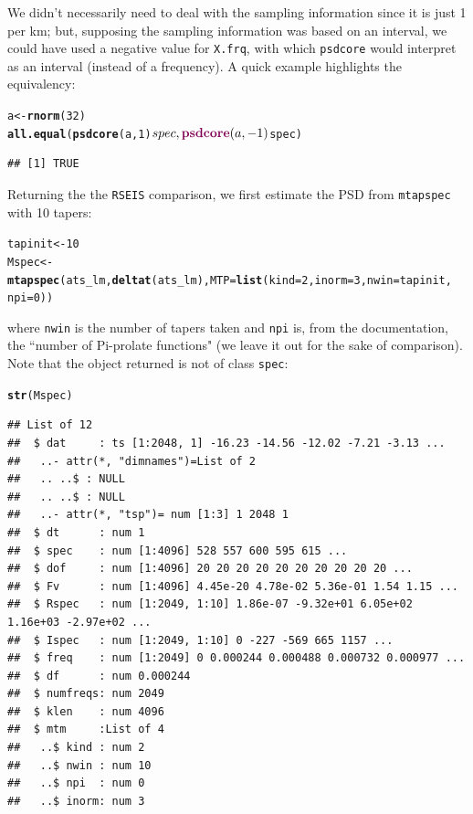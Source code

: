 \documentclass[10pt]{article}\usepackage{graphicx, color}
\makeatletter
\newcommand{\hlfunctioncall}[1]{\textcolor[rgb]{0.501960784313725,0,0.329411764705882}{\textbf{#1}}}%
\newenvironment{kframe}{%
 \def\at@end@of@kframe{}%
 \ifinner\ifhmode%
  \def\at@end@of@kframe{\end{minipage}}%
  \begin{minipage}{\columnwidth}%
 \fi\fi%
 \def\FrameCommand##1{\hskip\@totalleftmargin \hskip-\fboxsep
 \colorbox{shadecolor}{##1}\hskip-\fboxsep
     \hskip-\linewidth \hskip-\@totalleftmargin \hskip\columnwidth}%
 \MakeFramed {\advance\hsize-\width
   \@totalleftmargin\z@ \linewidth\hsize
   \@setminipage}}%
 {\par\unskip\endMakeFramed%
 \at@end@of@kframe}
\newenvironment{knitrout}{}{} %
\newcommand{\Rcmd}[1]{\texttt{#1}}
\makeatother
\begin{document}
We didn't necessarily need to deal with the sampling information since it is just 1 per km;
but, supposing the sampling information was based on an interval, we
could have used
a negative value for \Rcmd{X.frq}, 
with which \Rcmd{psdcore}
would interpret as
an interval (instead of a frequency). 
A quick example highlights the equivalency:
\begin{knitrout}
\color{fgcolor}\begin{kframe}
\begin{alltt}
a <- \hlfunctioncall{rnorm}(32)
\hlfunctioncall{all.equal}(\hlfunctioncall{psdcore}(a, 1)$spec, \hlfunctioncall{psdcore}(a, -1)$spec)
\end{alltt}
\begin{verbatim}
## [1] TRUE
\end{verbatim}
\end{kframe}
\end{knitrout}


Returning the the \Rcmd{RSEIS} comparison, we first 
estimate the PSD from \Rcmd{mtapspec} with 10 tapers:
\begin{knitrout}
\color{fgcolor}\begin{kframe}
\begin{alltt}
tapinit <- 10
Mspec <- \hlfunctioncall{mtapspec}(ats_lm, \hlfunctioncall{deltat}(ats_lm), MTP = \hlfunctioncall{list}(kind = 2, inorm = 3, nwin = tapinit, 
    npi = 0))
\end{alltt}
\end{kframe}
\end{knitrout}

where \Rcmd{nwin} is the number of tapers taken and
\Rcmd{npi} is, from the documentation, the ``number of Pi-prolate functions" (we
leave it out for the sake of comparison). 
Note that the object returned
is not of class \Rcmd{spec}:
\begin{knitrout}
\color{fgcolor}\begin{kframe}
\begin{alltt}
\hlfunctioncall{str}(Mspec)
\end{alltt}
\begin{verbatim}
## List of 12
##  $ dat     : ts [1:2048, 1] -16.23 -14.56 -12.02 -7.21 -3.13 ...
##   ..- attr(*, "dimnames")=List of 2
##   .. ..$ : NULL
##   .. ..$ : NULL
##   ..- attr(*, "tsp")= num [1:3] 1 2048 1
##  $ dt      : num 1
##  $ spec    : num [1:4096] 528 557 600 595 615 ...
##  $ dof     : num [1:4096] 20 20 20 20 20 20 20 20 20 20 ...
##  $ Fv      : num [1:4096] 4.45e-20 4.78e-02 5.36e-01 1.54 1.15 ...
##  $ Rspec   : num [1:2049, 1:10] 1.86e-07 -9.32e+01 6.05e+02 1.16e+03 -2.97e+02 ...
##  $ Ispec   : num [1:2049, 1:10] 0 -227 -569 665 1157 ...
##  $ freq    : num [1:2049] 0 0.000244 0.000488 0.000732 0.000977 ...
##  $ df      : num 0.000244
##  $ numfreqs: num 2049
##  $ klen    : num 4096
##  $ mtm     :List of 4
##   ..$ kind : num 2
##   ..$ nwin : num 10
##   ..$ npi  : num 0
##   ..$ inorm: num 3
\end{verbatim}
\end{kframe}
\end{knitrout}
\end{document}
